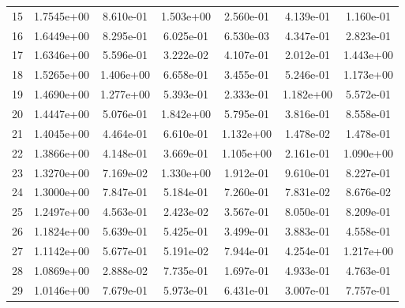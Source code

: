 \begin{longtable}{c c c c c c c}
15 & 1.7545e+00 & 8.610e-01 & 1.503e+00 & 2.560e-01 & 4.139e-01 & 1.160e-01 \\
16 & 1.6449e+00 & 8.295e-01 & 6.025e-01 & 6.530e-03 & 4.347e-01 & 2.823e-01 \\
17 & 1.6346e+00 & 5.596e-01 & 3.222e-02 & 4.107e-01 & 2.012e-01 & 1.443e+00 \\
18 & 1.5265e+00 & 1.406e+00 & 6.658e-01 & 3.455e-01 & 5.246e-01 & 1.173e+00 \\
19 & 1.4690e+00 & 1.277e+00 & 5.393e-01 & 2.333e-01 & 1.182e+00 & 5.572e-01 \\
20 & 1.4447e+00 & 5.076e-01 & 1.842e+00 & 5.795e-01 & 3.816e-01 & 8.558e-01 \\
21 & 1.4045e+00 & 4.464e-01 & 6.610e-01 & 1.132e+00 & 1.478e-02 & 1.478e-01 \\
22 & 1.3866e+00 & 4.148e-01 & 3.669e-01 & 1.105e+00 & 2.161e-01 & 1.090e+00 \\
23 & 1.3270e+00 & 7.169e-02 & 1.330e+00 & 1.912e-01 & 9.610e-01 & 8.227e-01 \\
24 & 1.3000e+00 & 7.847e-01 & 5.184e-01 & 7.260e-01 & 7.831e-02 & 8.676e-02 \\
25 & 1.2497e+00 & 4.563e-01 & 2.423e-02 & 3.567e-01 & 8.050e-01 & 8.209e-01 \\
26 & 1.1824e+00 & 5.639e-01 & 5.425e-01 & 3.499e-01 & 3.883e-01 & 4.558e-01 \\
27 & 1.1142e+00 & 5.677e-01 & 5.191e-02 & 7.944e-01 & 4.254e-01 & 1.217e+00 \\
28 & 1.0869e+00 & 2.888e-02 & 7.735e-01 & 1.697e-01 & 4.933e-01 & 4.763e-01 \\
29 & 1.0146e+00 & 7.679e-01 & 5.973e-01 & 6.431e-01 & 3.007e-01 & 7.757e-01 \\
\end{longtable}

